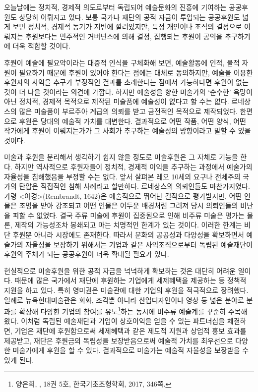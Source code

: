 오늘날에는 정치적, 경제적 의도로부터 독립되어 예술문화의 진흥에 기여하는 공공후원도 상당히 이뤄지고 있다. 보통 국가나 재단의 공적 자금이 투입되는 공공후원도 넓게 보면 정치적, 경제적 동기가 저변에 깔려있지만, 특정 개인이나 조직의 결정으로 이뤄지는 후원보다는 민주적인 거버넌스에 의해 결정, 집행되는 후원이 공익을 추구하기에 더욱 적합할 것이다.

후원이 예술에 필요악이라는 대중적 인식을 구체화해 보면, 예술활동에 인적, 물적 자원이 필요하기 때문에 후원이 있어야 한다는 점에는 대체로 동의하지만, 예술을 이용한 후원자의 사익을 추구가 부정적인 결과를 초래한다는 점에서 가능하다면 후원이 없는 것이 더 나을 것이라는 의견에 가깝다. 하지만 예술성을 향한 미술가의 `순수한' 욕망이 아닌 정치적, 경제적 목적으로 제작된 미술품에 예술성이 없다고 할 수는 없다. 르네상스의 많은 미술품이 부르주아 계급의 의뢰를 받고 금전적인 목적으로 제작되었다. 한편으로 후원은 당대의 예술적 가치를 대변한다. 결과적으로 어떤 작품, 어떤 양식, 어떤 작가에게 후원이 이뤄지는가가 그 사회가 추구하는 예술성의 방향이라고 말할 수 있을 것이다.

미술과 후원을 분리해서 생각하기 쉽지 않을 정도로 미술후원은 그 자체로 기능을 한다. 하지만 역사적으로 후원자들이 정치적, 경제적 이익을 추구하는 과정에서 예술가의 자율성을 침해했음을 부정할 수는 없다. 앞서 살펴본 레오 10세의 요구나 전체주의 국가의 탄압은 직접적인 침해 사례라고 할만하다. 르네상스의 의뢰인들도 마찬가지였다. 가령 <야경>(Rembrandt, 1642)은 예술적으로 뛰어난 걸작으로 평가받지만, 어떤 인물은 조명을 받아 강조되고 어떤 인물은 어두운 배경처럼 그려져 당시 의뢰인들의 비난을 피할 수 없었다. 결국 주류 미술에 후원이 집중됨으로 인해 비주류 미술은 평가는 물론, 제작의 가능성조차 봉쇄되고 마는 치명적인 한계가 있는 것이다. 이러한 한계는 비단 후원뿐 아니라 시장에도 존재한다. 따라서 문화의 공공성과 다양성을 확보하면서 예술가의 자율성을 보장하기 위해서는 기업과 같은 사익조직으로부터 독립된 예술재단이 후원의 주체가 되는 공공후원이 더욱 확대될 필요가 있다.

현실적으로 미술후원을 위한 공적 자금을 넉넉하게 확보하는 것은 대단히 어려운 일이다. 때문에 많은 국가에서 재단에 후원하는 기업에게 세제혜택을 제공하는 등 정책적 지원을 하고 있다. 특히 영미권은 미술관에 대한 기업의 후원을 적극적으로 장려했다. 일례로 뉴욕현대미술관은 회화, 조각뿐 아니라 산업디자인이나 영상 등 넓은 분야로 분과를 확장해 다양한 기업의 참여를 유도\footnote{양은희, ,  18권 5호, 한국기초조형학회, 2017, 346쪽.}하는 동시에 비주류 예술계를 꾸준히 주목해 왔다. 이처럼 독립된 예술재단과 기업이 상호이익을 얻을 수 있는 파트너십을 체결하면, 기업은 재단에 후원함으로써 세제혜택과 같은 제도적 지원과 상업적 홍보 효과를 제공받고, 재단은 후원금의 독립성을 보장받음으로써 예술적 가치를 최우선으로 다양한 미술가에게 후원을 할 수 있다. 결과적으로 미술가는 예술적 자율성을 보장받을 수 있게 된다.

